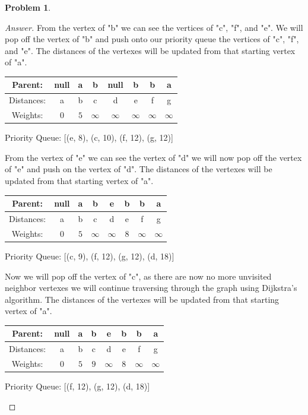 \documentclass[11pt]{article}
\theoremstyle{definition}
\theoremstyle{definition}
\newtheorem{required}{Problem}
\theoremstyle{definition}
\begin{document}
\begin{required}
\begin{proof}[Answer]
From the vertex of "b" we can see the vertices of "c", "f", and "e". We will pop off the vertex of "b" and push onto our priority queue the vertices of "c", "f", and "e". The distances of the vertexes will be updated from that starting vertex of "a".\\
\begin{center}
\begin{tabular}{ | c | c | c | c | c | c | c | c | }
 \hline
 Parent:& null & a &  b & null & b & b & a\\ 
 \hline
 Distances:& a & b & c & d & e & f & g\\  
 \hline
 Weights: & $0$ & $5$ & $\infty$ & $\infty$ & $\infty$ & $\infty$ &$\infty$\\
  \hline
\end{tabular}
\end{center}
\begin{center}
Priority Queue: [(e, 8), (c, 10), (f, 12), (g, 12)]
\end{center}

From the vertex of "e" we can see the vertex of "d" we will now pop off the vertex of "e" and push on the vertex of "d". The distances of the vertexes will be updated from that starting vertex of "a".\\
\begin{center}
\begin{tabular}{ | c | c | c | c | c | c | c | c | }
 \hline
 Parent:& null & a &  b & e & b & b & a\\ 
 \hline
 Distances:& a & b & c & d & e & f & g\\  
 \hline
 Weights: & $0$ & $5$ & $\infty$ & $\infty$ & $8$ & $\infty$ &$\infty$\\
  \hline
\end{tabular}
\end{center}
\begin{center}
Priority Queue: [(c, 9), (f, 12), (g, 12), (d, 18)]
\end{center}

Now we will pop off the vertex of "c", as there are now no more unvisited neighbor vertexes we will continue traversing through the graph using Dijkstra's algorithm. The distances of the vertexes will be updated from that starting vertex of "a".\\
\begin{center}
\begin{tabular}{ | c | c | c | c | c | c | c | c | }
 \hline
 Parent:& null & a &  b & e & b & b & a\\ 
 \hline
 Distances:& a & b & c & d & e & f & g\\  
 \hline
 Weights: & $0$ & $5$ & $9$ & $\infty$ & $8$ & $\infty$ &$\infty$\\
  \hline
\end{tabular}
\end{center}
\begin{center}
Priority Queue: [(f, 12), (g, 12), (d, 18)]
\end{center}


\end{proof}
\end{required}
\end{document}
